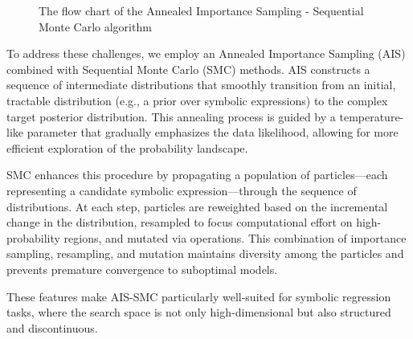 \documentclass[11pt]{article}
\begin{document}
\begin{figure}[h!]
\begin{minipage}{15cm}
\begin{tcolorbox}
				\end{tcolorbox}
			\end{minipage}
			\caption{The flow chart of the Annealed Importance Sampling - Sequential Monte Carlo algorithm}
			\label{ASMCflowchart}
		\end{figure}
		
		To address these challenges, we employ an Annealed Importance Sampling (AIS) combined with Sequential Monte Carlo (SMC) methods. AIS constructs a sequence of intermediate distributions that smoothly transition from an initial, tractable distribution (e.g., a prior over symbolic expressions) to the complex target posterior distribution. This annealing process is guided by a temperature-like parameter that gradually emphasizes the data likelihood, allowing for more efficient exploration of the probability landscape.
		
		SMC enhances this procedure by propagating a population of particles—each representing a candidate symbolic expression—through the sequence of distributions. At each step, particles are reweighted based on the incremental change in the distribution, resampled to focus computational effort on high-probability regions, and mutated via operations. This combination of importance sampling, resampling, and mutation maintains diversity among the particles and prevents premature convergence to suboptimal models.
		
		These features make AIS-SMC particularly well-suited for symbolic regression tasks, where the search space is not only high-dimensional but also structured and discontinuous. 
		
		
\end{document}

